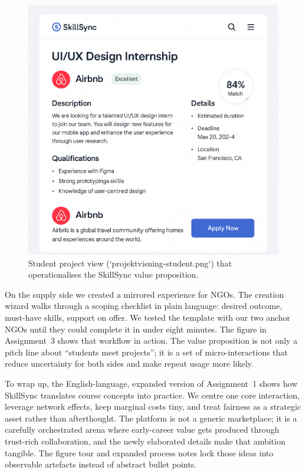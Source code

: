 \begin{figure}[h]
  \centering
  \includegraphics[width=0.85\linewidth]{figures/projektvisning-student.png}
  \caption{Student project view (`projektvisning-student.png`) that operationalises the SkillSync value proposition.}
  \label{fig:student-view}
\end{figure}

On the supply side we created a mirrored experience for NGOs. The creation wizard walks through a scoping checklist in plain language: desired outcome, must-have skills, support on offer. We tested the template with our two anchor NGOs until they could complete it in under eight minutes. The figure in Assignment~3 shows that workflow in action. The value proposition is not only a pitch line about ``students meet projects''; it is a set of micro-interactions that reduce uncertainty for both sides and make repeat usage more likely.

To wrap up, the English-language, expanded version of Assignment~1 shows how SkillSync translates course concepts into practice. We centre one core interaction, leverage network effects, keep marginal costs tiny, and treat fairness as a strategic asset rather than afterthought. The platform is not a generic marketplace; it is a carefully orchestrated arena where early-career value gets produced through trust-rich collaboration, and the newly elaborated details make that ambition tangible. The figure tour and expanded process notes lock those ideas into observable artefacts instead of abstract bullet points.
